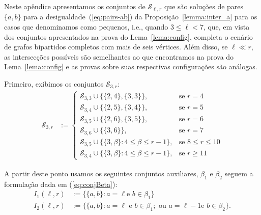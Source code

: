 \documentclass[12pt,a4paper]{book}
\newcommand{\Slr}{\mathcal{S}_{\ell,r}} %
\begin{document}
Neste apêndice apresentamos os conjuntos de $\Slr$ 
que são soluções de pares $\{a,b\}$ para a desigualdade~(\ref{eq:pairs-ab})
da Proposição~\ref{lemma:inter_a} para os casos que denominamos como pequenos, i.e., quando $3 \leq \ell < 7$, 
que, em vista dos conjuntos apresentados na prova do Lema~\ref{lema:config}, completa o cenário de grafos bipartidos completos com mais de seis vértices.
%
Além disso, se $\ell \ll r$, as intersecções possíveis são semelhantes ao que encontramos na prova do Lema~\ref{lema:config} e as provas sobre suas respectivas configurações são análogas.  

Primeiro, exibimos os conjuntos $\mathcal{S}_{3,r}$:
\begin{equation*}%
     \begin{aligned}
        \mathcal{S}_{3, r}
            &:=
    \begin{cases}
        \mathcal{S}_{3,3} \cup \{\{2,4\}, \{3,3\}\}, 
        & \text{se }  r=4   \\ 
        \mathcal{S}_{3,4} \cup \{\{2,5\}, \{3,4\}\}, 
        & \text{se }  r=5    \\ 
        \mathcal{S}_{3,5} \cup \{\{2,6\}, \{3,5\}\}, 
        & \text{se }  r=6    \\ 
         \mathcal{S}_{3,6} \cup \{\{3,6\}\}, 
        & \text{se }  r=7    \\ 
		\mathcal{S}_{3,5} \cup \{\{3,\beta\}: 4 \leq \beta \leq r-1\}, & \text{se }  8\leq r \leq 10 \\
        \mathcal{S}_{3,4} \cup \{\{3,\beta\}: 4 \leq \beta \leq r-1\}, & \text{se }  r \geq 11
        \end{cases}
    \end{aligned}  
\end{equation*}

A partir deste ponto usamos os seguintes conjuntos auxiliares, $\beta_1$ e $\beta_2$ seguem a formulação dada em (\ref{eq:conjBeta}):
\begin{equation*}
    \begin{aligned}
        I_1(\ell,r) &:= \{\{a,b\}: a=\ell\text{
    e }b\in \beta_1\}
        \\
        I_2(\ell,r) &:= \{\{a,b\}: a=\ell\text{ e }b\in \beta_1;\text{ ou }a=\ell-1\text{
    e }b\in \beta_2\}.
    \end{aligned}
\end{equation*}
\end{document}
